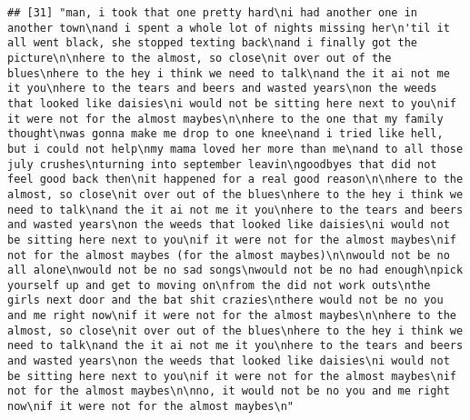 \documentclass[]{article}
\begin{document}
\begin{verbatim}
## [31] "man, i took that one pretty hard\ni had another one in another town\nand i spent a whole lot of nights missing her\n'til it all went black, she stopped texting back\nand i finally got the picture\n\nhere to the almost, so close\nit over out of the blues\nhere to the hey i think we need to talk\nand the it ai not me it you\nhere to the tears and beers and wasted years\non the weeds that looked like daisies\ni would not be sitting here next to you\nif it were not for the almost maybes\n\nhere to the one that my family thought\nwas gonna make me drop to one knee\nand i tried like hell, but i could not help\nmy mama loved her more than me\nand to all those july crushes\nturning into september leavin\ngoodbyes that did not feel good back then\nit happened for a real good reason\n\nhere to the almost, so close\nit over out of the blues\nhere to the hey i think we need to talk\nand the it ai not me it you\nhere to the tears and beers and wasted years\non the weeds that looked like daisies\ni would not be sitting here next to you\nif it were not for the almost maybes\nif not for the almost maybes (for the almost maybes)\n\nwould not be no all alone\nwould not be no sad songs\nwould not be no had enough\npick yourself up and get to moving on\nfrom the did not work outs\nthe girls next door and the bat shit crazies\nthere would not be no you and me right now\nif it were not for the almost maybes\n\nhere to the almost, so close\nit over out of the blues\nhere to the hey i think we need to talk\nand the it ai not me it you\nhere to the tears and beers and wasted years\non the weeds that looked like daisies\ni would not be sitting here next to you\nif it were not for the almost maybes\nif not for the almost maybes\n\nno, it would not be no you and me right now\nif it were not for the almost maybes\n"                                                                                                                                                                                                                                                                                                                                                                                                                                                                                                                                                                                                                                                                                                                                                                                                                                                                                                                                                                                                                                                                                        

\end{verbatim}
\end{document}
